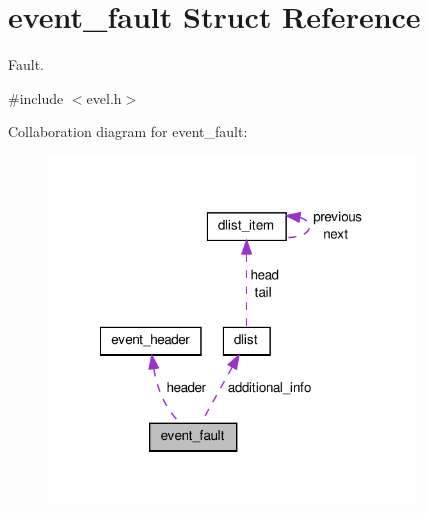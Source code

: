 \hypertarget{structevent__fault}{}\section{event\+\_\+fault Struct Reference}
\label{structevent__fault}


Fault.  




{\ttfamily \#include $<$evel.\+h$>$}



Collaboration diagram for event\+\_\+fault\+:
\nopagebreak
\begin{figure}[H]
\begin{center}
\leavevmode
\includegraphics[width=276pt]{structevent__fault__coll__graph}
\end{center}
\end{figure}
